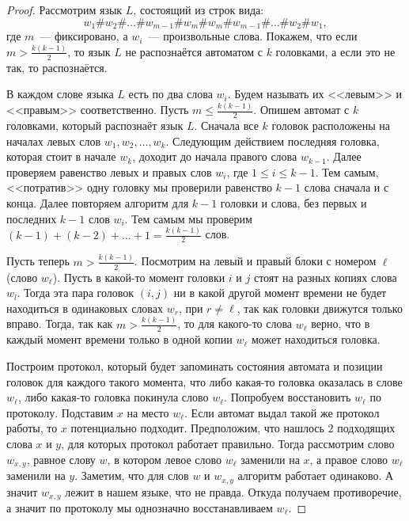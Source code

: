 \begin{proof}
    Рассмотрим язык $L$, состоящий из строк вида:
    $$
        w_1\#w_2\#\ldots \#w_{m - 1}\#w_m\#w_m\#w_{m - 1}\#\ldots \#w_2\#w_1,
    $$
    где $m$~--- фиксировано, а $w_i$~--- произвольные слова. Покажем, что если $m > \frac{k(k - 1)}{2}$,
    то язык $L$ не распознаётся автоматом с $k$ головками, а если это не так, то распознаётся.
    
    В каждом слове языка $L$ есть по два слова $w_i$. Будем называть их <<левым>> и <<правым>>
    соответственно. Пусть $m \leq \frac{k(k - 1)}{2}$. Опишем автомат с $k$ головками, который распознаёт
    язык $L$. Сначала все $k$ головок расположены на началах левых слов $w_1, w_2, \ldots,
    w_k$. Следующим действием последняя головка, которая стоит в начале $w_k$, доходит до начала правого
    слова $w_{k - 1}$. Далее проверяем равенство левых и правых слов $w_i$, где $1 \leq i \leq k -
    1$. Тем самым, <<потратив>> одну головку мы проверили равенство $k - 1$ слова сначала и с
    конца. Далее повторяем алгоритм для $k - 1$ головки и слова, без первых и последних $k - 1$ слов
    $w_i$. Тем самым мы проверим $(k - 1) + (k - 2) + \ldots + 1 = \frac{k(k - 1)}{2}$ слов. 
    
    Пусть теперь $m > \frac{k(k - 1)}{2}$. Посмотрим на левый и правый блоки с номером $\ell$ (слово
    $w_{\ell}$). Пусть в какой-то момент головки $i$ и $j$ стоят на разных копиях слова $w_l$. Тогда эта
    пара головок $(i, j)$ ни в какой другой момент времени не будет находиться в одинаковых словах $w_r$,
    при $r \neq \ell$, так как головки движутся только вправо. Тогда, так как $m > \frac{k(k - 1)}{2}$,
    то для какого-то слова $w_{\ell}$ верно, что в каждый момент времени только в одной копии $w_{\ell}$ может
    находиться головка. 
    
    Построим протокол, который будет запоминать состояния автомата и позиции головок для каждого такого
    момента, что либо какая-то головка оказалась в слове $w_{\ell}$, либо какая-то головка покинула слово
    $w_{\ell}$. Попробуем восстановить $w_{\ell}$ по протоколу. Подставим $x$ на место $w_{\ell}$. Если
    автомат выдал такой же протокол работы, то $x$ потенциально подходит. Предположим, что нашлось $2$
    подходящих слова $x$ и $y$, для которых протокол работает правильно. Тогда рассмотрим слово
    $w_{x, y}$, равное слову $w$, в котором левое слово $w_{\ell}$ заменили на $x$, а правое слово
    $w_{\ell}$ заменили на $y$. Заметим, что для слов $w$ и $w_{x, y}$ алгоритм работает одинаково. А
    значит $w_{x, y}$ лежит в нашем языке, что не правда. Откуда получаем противоречие, а значит по
    протоколу мы однозначно восстанавливаем $w_{\ell}$.
    

\end{proof}
